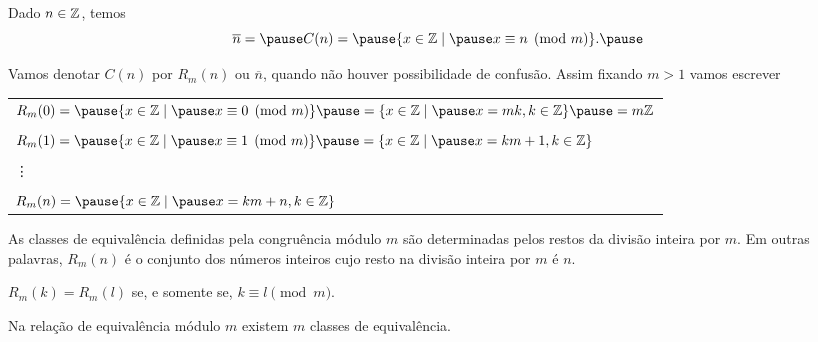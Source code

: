 \documentclass{beamer}
\begin{document}
    \begin{frame}
        Dado $n \in \mathbb{Z}$, temos\pause
        \[
            \overline{n} = \pause C(n) = \pause \{x \in \z \mid \pause x\equiv n \pmod{m}\}.\pause
        \]

        Vamos denotar $C(n)$ \pause por $R_m(n)$ \pause ou $\overline{n}$, \pause quando não houver possibilidade de confusão. \pause Assim fixando $m > 1$ vamos escrever\pause
        \begin{center}
            \begin{tabular}{l}
                $R_m(0) = \pause \{x \in \z \mid \pause x\equiv 0 \pmod{m}\} \pause =\{x \in \z \mid \pause x = mk, k \in \z\}\pause = m\z$\pause\\
                \\
                $R_m(1) = \pause \{x \in \z \mid \pause x\equiv 1 \pmod m\} \pause = \{x \in \z \mid \pause x = km + 1, k \in \z \}$\pause \\
                \\
                \vdots\\
                \\
                $R_m(n) = \pause \{x \in \z \mid \pause x = km + n, k \in \z \}$
            \end{tabular}
        \end{center}
    \end{frame}

    \begin{frame}
        \begin{proposicao}
            As classes de equivalência definidas pela congruência módulo $m$ \pause são determinadas pelos restos da divisão inteira por $m$. \pause Em outras palavras, $R_m(n)$ \pause é o conjunto dos números inteiros \pause cujo resto na divisão inteira por $m$ é $n$.\pause
        \end{proposicao}

        \begin{corolario}
            $R_m(k) = R_m(l)$ \pause se, e somente se, $k\equiv l \pmod m$.
        \end{corolario}
    \end{frame}

    \begin{frame}
        \begin{proposicao}
            Na relação de equivalência módulo $m$ existem $m$ classes de equivalência.\pause
        \end{proposicao}
    \end{frame}
\end{document}
